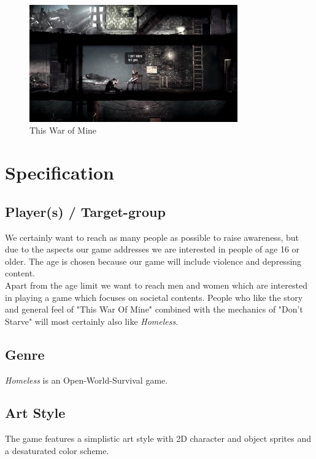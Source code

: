 \documentclass[a4paper]{scrreprt}
\begin{document}
\begin{figure}[h]
\centering
\includegraphics[width=0.8\textwidth]{TWoM.jpg}
\caption{\label{fig:twom} This War of Mine}
\end{figure}


\chapter{Specification}

\section{Player(s) / Target-group}
We certainly want to reach as many people as possible to raise awareness, but due to the aspects our game addresses we are interested in people of age 16 or older. The age is chosen because our game will include violence and depressing content.\\
Apart from the age limit we want to reach men and women which are interested in playing a game which focuses on societal contents. People who like the story and general feel of "This War Of Mine" combined with the mechanics of "Don't Starve" will most certainly also like \textit{Homeless}.

\section{Genre}
\textit{Homeless} is an Open-World-Survival game.

\section{Art Style}
The game features a simplistic art style with 2D character and object sprites and a desaturated color scheme.
\end{document}
